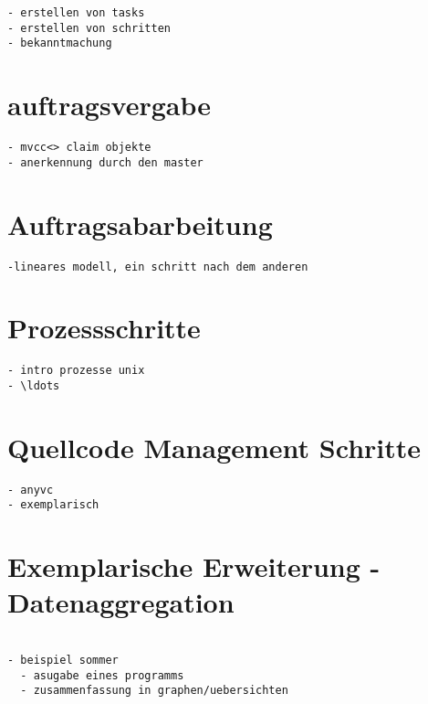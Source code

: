 \begin{verbatim}
- erstellen von tasks
- erstellen von schritten
- bekanntmachung
\end{verbatim}

\section{auftragsvergabe}

\begin{verbatim}
- mvcc<> claim objekte
- anerkennung durch den master

\end{verbatim}

\section{Auftragsabarbeitung}
\begin{verbatim}
-lineares modell, ein schritt nach dem anderen
\end{verbatim}

\section{Prozessschritte}

\begin{verbatim}
- intro prozesse unix
- \ldots
\end{verbatim}

\section{Quellcode Management Schritte}


\begin{verbatim}
- anyvc
- exemplarisch
\end{verbatim}

\section{Exemplarische Erweiterung - Datenaggregation}

\begin{verbatim}

- beispiel sommer
  - asugabe eines programms
  - zusammenfassung in graphen/uebersichten

\end{verbatim}

